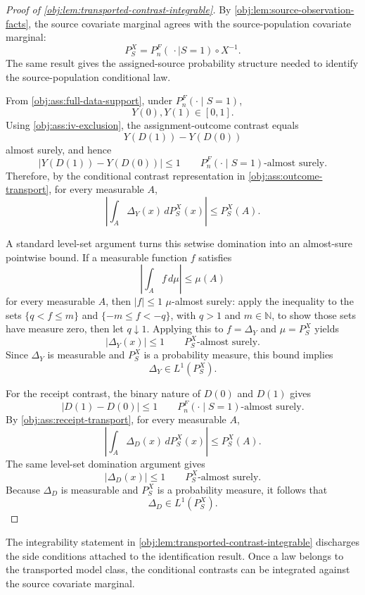 \documentclass[11pt]{article}
\begin{document}
\begin{proof}[Proof of \cref{obj:lem:transported-contrast-integrable}]
By \cref{obj:lem:source-observation-facts}, the source covariate marginal agrees with the source-population covariate marginal:
\[
P_S^X
=
P_n^F(\,\cdot\mid S=1)\circ X^{-1}.
\]
The same result gives the assigned-source probability structure needed to identify the source-population conditional law. %

From \cref{obj:ass:full-data-support}, under \(P_n^F(\cdot\mid S=1)\),
\[
Y(0),Y(1)\in[0,1].
\]
Using \cref{obj:ass:iv-exclusion}, the assignment-outcome contrast equals
\[
Y(D(1))-Y(D(0))
\]
almost surely, and hence
\[
\left|Y(D(1))-Y(D(0))\right|\le1
\qquad P_n^F(\cdot\mid S=1)\text{-almost surely}.
\]
Therefore, by the conditional contrast representation in \cref{obj:ass:outcome-transport}, for every measurable \(A\),
\[
\left|\int_A \Delta_Y(x)\,dP_S^X(x)\right|
\le
P_S^X(A).
\]

A standard level-set argument turns this setwise domination into an almost-sure pointwise bound. If a measurable function \(f\) satisfies
\[
\left|\int_A f\,d\mu\right|\le\mu(A)
\]
for every measurable \(A\), then \(|f|\le1\) \(\mu\)-almost surely: apply the inequality to the sets \(\{q<f\le m\}\) and \(\{-m\le f<-q\}\), with \(q>1\) and \(m\in\mathbb N\), to show those sets have measure zero, then let \(q\downarrow1\). Applying this to \(f=\Delta_Y\) and \(\mu=P_S^X\) yields
\[
|\Delta_Y(x)|\le1
\qquad P_S^X\text{-almost surely}.
\]
Since \(\Delta_Y\) is measurable and \(P_S^X\) is a probability measure, this bound implies
\[
\Delta_Y\in L^1(P_S^X).
\]

For the receipt contrast, the binary nature of \(D(0)\) and \(D(1)\) gives
\[
\left|D(1)-D(0)\right|\le1
\qquad P_n^F(\cdot\mid S=1)\text{-almost surely}.
\]
By \cref{obj:ass:receipt-transport}, for every measurable \(A\),
\[
\left|\int_A \Delta_D(x)\,dP_S^X(x)\right|
\le
P_S^X(A).
\]
The same level-set domination argument gives
\[
|\Delta_D(x)|\le1
\qquad P_S^X\text{-almost surely}.
\]
Because \(\Delta_D\) is measurable and \(P_S^X\) is a probability measure, it follows that
\[
\Delta_D\in L^1(P_S^X).
\]
\end{proof}

The integrability statement in \cref{obj:lem:transported-contrast-integrable} discharges the side conditions attached to the identification result. Once a law belongs to the transported model class, the conditional contrasts can be integrated against the source covariate marginal.
\end{document}
